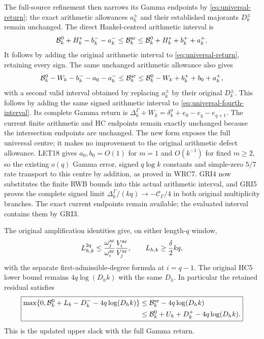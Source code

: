 \documentclass[11pt,a4paper]{article}
\begin{document}
The full-source refinement then narrows its Gamma endpoints
by \eqref{eq:universal-return}; the exact arithmetic allowances
$a_k^\pm$ and their established majorants $D_k^\pm$ remain
unchanged. The direct Hankel-centred arithmetic interval is
\begin{equation}
 \mathcal B_k^0+H_k^*-b_k^--a_k^-
 \leq\mathcal B_k^{\rm ar}
 \leq\mathcal B_k^0+H_k^*+b_k^++a_k^+.
\end{equation}
It follows by adding the original arithmetic interval to
\eqref{eq:universal-return}, retaining every sign.
The same unchanged arithmetic allowance also gives
\begin{equation}
 \mathcal B_k^0-W_k-b_k^--a_0-a_k^-
 \leq\mathcal B_k^{\rm ar}
 \leq\mathcal B_k^0-W_k+b_k^++b_0+a_k^+,
 \label{eq:universal-centred-arithmetic}
\end{equation}
with a second valid interval obtained by replacing $a_k^\pm$
by their original $D_k^\pm$. This follows by adding the same
signed arithmetic interval to \eqref{eq:universal-fourth-interval}.
Its complete Gamma return is
$\Delta_k^\Gamma+W_k=\delta_k^\sigma+e_0-e_q-e_{q+1}$.
The current finite arithmetic and HC endpoints remain exactly
unchanged because the intersection endpoints are unchanged.
The new form exposes the full universal centre; it makes no
improvement to the original arithmetic defect allowance.
LET18 gives $a_0,b_0=O(1)$ for $m=1$ and $O(k^{-1})$
for fixed $m\geq2$, so the existing $o(q)$ Gamma error,
signed $q\log k$ constants and simple-zero $5/7$ rate
transport to this centre by addition, as proved in WRC7.
GRI4 now substitutes the finite RWB bounds into this actual
arithmetic interval, and GRI5 proves the complete signed limit
$\Delta_k^\Gamma/(kq)\to-\mathcal C_\Gamma/4$ in both
original multiplicity branches. The exact current endpoints
remain available; the evaluated interval contains them by GRI3.

The original amplification identities give, on either length-$q$ window,
\begin{equation}
 L_{h,k}^{2q}\le
 \frac{\omega_j^{\rm ar}}{\omega_i^{\rm ar}}
 \frac{V_i^{\rm ar}}{V_j^{\rm ar}},\qquad
 L_{h,k}\ge\frac\delta2 kq,
\end{equation}
with the separate first-admissible-degree formula at $i=q-1$.
The original HC5 lower bound remains $4q\log(D_hk)$ with the
same $D_h$. In particular the retained residual satisfies
\begin{equation}
 \boxed{\begin{aligned}
 \max\{0,\mathcal B_k^0+L_k-D_k^--4q\log(D_hk)\}
 &\le\mathcal B_k^{\rm ar}-4q\log(D_hk)\\
 &\le\mathcal B_k^0+U_k+D_k^+-4q\log(D_hk).
 \end{aligned}}
\end{equation}
This is the updated upper slack with the full Gamma return.
\end{document}
